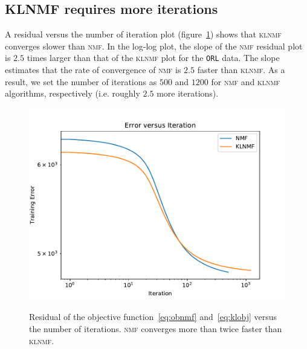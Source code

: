 \subsection{KLNMF requires more iterations}
A residual versus the number of iteration plot (figure~\ref{error}) shows that \textsc{klnmf} converges slower than \textsc{nmf}. In the log-log plot, the slope of the \textsc{nmf} residual plot is $2.5$ times larger than that of the \textsc{klnmf} plot for the \texttt{ORL} data. The slope estimates that the rate of convergence of \textsc{nmf} is $2.5$ faster than \textsc{klnmf}. As a result, we set the number of iterations as $500$ and $1200$ for \textsc{nmf} and \textsc{klnmf} algorithms, respectively (i.e. roughly $2.5$ more iterations).
 \begin{figure}
  \centering
  \includegraphics[scale=.8]{error}\\
  \caption{Residual of the objective function~\eqref{eq:obnmf} and~\eqref{eq:klobj} versus the number of iterations. \textsc{nmf} converges more than twice faster than \textsc{klnmf}.}\label{error}
\end{figure}

